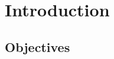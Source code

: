 \documentclass[article,A4,12pt]{llncs}
\begin{document}
\newpage
\pagestyle{empty}
\section*{}
\small
%
%

\normalsize

\newpage
\setcounter{tocdepth}{2}
\tableofcontents

\newpage

\pagestyle{plain}
\setcounter{page}{1}


\section{Introduction}

\subsection{Objectives} 
\end{document}
